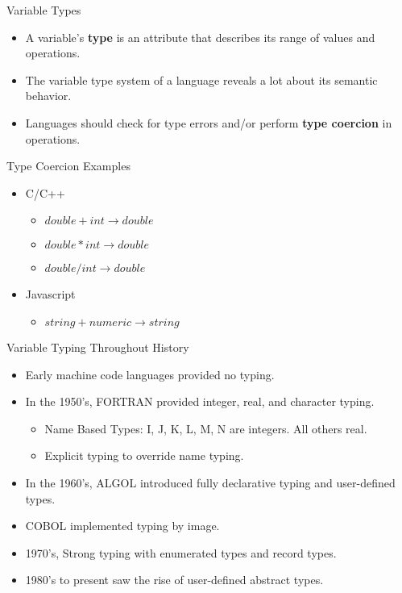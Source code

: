 \documentclass[handout]{beamer}
\begin{document}
\begin{frame}{Variable Types}
    \begin{itemize}
        \item A variable's \textbf{type} is an attribute that describes its range of values and operations.
        \item The variable type system of a language reveals a lot about its semantic behavior.
        \item Languages should check for type errors and/or perform \textbf{type coercion} in operations.
    \end{itemize}
\end{frame}

\begin{frame}[fragile]{Type Coercion Examples}
    \begin{itemize}
        \item C/C++
        \begin{itemize}
            \item $double + int \rightarrow double$
            \item $double * int \rightarrow double$
            \item $double / int \rightarrow double$
        \end{itemize}
        \item Javascript
        \begin{itemize}
            \item $string + numeric \rightarrow string$
        \end{itemize}
    \end{itemize}
\end{frame}

\begin{frame}{Variable Typing Throughout History}
\begin{itemize}
    \item Early machine code languages provided no typing.
    \item In the 1950's, FORTRAN provided integer, real, and character typing.
    \begin{itemize}
        \item Name Based Types: I, J, K, L, M, N are integers. All others real.
        \item Explicit typing to override name typing.
    \end{itemize}
    \item In the 1960's, ALGOL introduced fully declarative typing and user-defined types.
    \item COBOL implemented typing by image.
    \item 1970's, Strong typing with enumerated types and record types.
    \item 1980's to present saw the rise of user-defined abstract types.
\end{itemize}
\end{frame}
\end{document}

